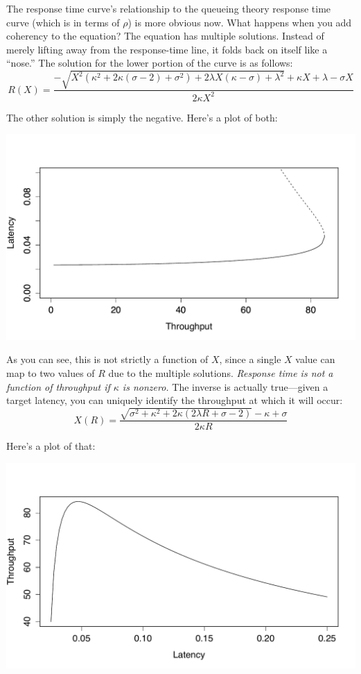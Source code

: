 \documentclass{vivid_layout}
\begin{document}
The response time curve's relationship to the queueing theory response time
curve (which is in terms of $\rho$) is more obvious now. What happens when you
add coherency to the equation? The equation has multiple solutions.  Instead of
merely lifting away from the response-time line, it folds back on itself like a
``nose.'' The solution for the lower portion of the curve is as follows:
\begin{equation}
R(X)=\frac{-\sqrt{X^2(\kappa^2+2\kappa(\sigma-2) + \sigma^2)+2\lambda X(\kappa-\sigma)+\lambda^2}+\kappa X+\lambda-\sigma X}{2\kappa X^2}
\label{r_x_lower}
\end{equation}

The other solution is simply the negative. Here's a plot of both:
\begin{center}
\includegraphics[width=.85\linewidth]{scalability/nose-equation}
\end{center}


As you can see, this is not strictly a function of $X$, since a single $X$ value
can map to two values of $R$ due to the multiple solutions. {\itshape Response
time is not a function of throughput if $\kappa$ is nonzero.} The inverse is
actually true---given a target latency, you can uniquely identify the throughput
at which it will occur:
\begin{equation}
X(R)=\frac{\sqrt{\sigma^2+\kappa^2+2\kappa(2\lambda R+\sigma-2)}-\kappa+\sigma}{2\kappa R}
\label{x_r}
\end{equation}

Here's a plot of that:
\begin{center}
\includegraphics[width=.85\linewidth]{scalability/x-function-r}
\end{center}
\end{document}
